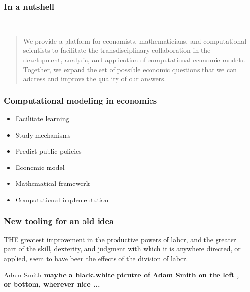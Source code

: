 \begin{frame}\frametitle{In a nutshell}
\hspace{1.5cm}
\\
\vspace{1cm}
\begin{quote}
	\large
	\raggedright
	We provide a platform for economists, mathematicians, and computational scientists to facilitate the transdisciplinary collaboration in the development, analysis, and application of computational economic models. Together, we expand the set of possible economic questions that we can address and improve the quality of our	answers.
\end{quote}


\end{frame}
\begin{frame}\frametitle{Computational modeling in economics}

	\begin{multicols}{2}
	\vspace{0.3cm}
	\begin{itemize}\setlength\itemsep{1em}
	\item Facilitate learning
	\item Study mechanisms
	\item Predict public policies
	\end{itemize}

	\pause

  \vspace{0.3cm}
	\begin{itemize}\setlength\itemsep{1em}
	\item Economic model
	\item Mathematical framework
	\item Computational implementation
	\end{itemize}
	\end{multicols}

\end{frame}

\begin{frame}\frametitle{New tooling for an old idea}

THE greatest improvement in the productive powers of labor, and the greater part of the skill, dexterity, and judgment with which it is anywhere directed, or applied, seem to have been the effects of the division of labor.


Adam Smith
\textbf{maybe a black-white picutre of Adam Smith on the left , or bottom, wherever nice ...}

\end{frame}

